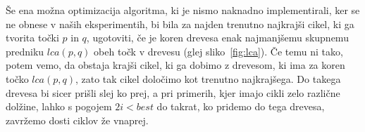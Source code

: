 \documentclass[a4paper, 12pt]{book}
\begin{document}
Še ena možna optimizacija algoritma, ki je nismo naknadno implementirali, ker se ne obnese v naših eksperimentih, bi bila za najden trenutno najkrajši cikel, ki ga tvorita točki $p$ in $q$, ugotoviti, če je koren drevesa enak najmanjšemu skupnemu predniku $lca(p,q)$ obeh točk v drevesu (glej sliko~\ref{fig:lca}). Če temu ni tako, potem vemo, da obstaja krajši cikel, ki ga dobimo z drevesom, ki ima za koren točko $lca(p,q)$, zato tak cikel določimo kot trenutno najkrajšega. Do takega drevesa bi sicer prišli slej ko prej, a pri primerih, kjer imajo cikli zelo različne dolžine, lahko s pogojem $2i < best$ do takrat, ko pridemo do tega drevesa, zavržemo dosti ciklov že vnaprej.



\end{document}
